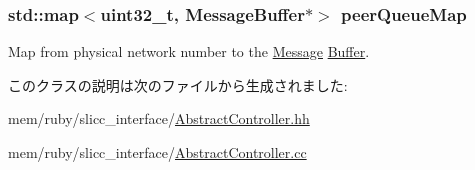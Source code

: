 \label{classAbstractController_a90f25dd5a7f1085002cab4e1e98f9232}
\hypertarget{classAbstractController_ab2e155eabfce9e3d4b821328ecb302f9}{
\subsubsection[{peerQueueMap}]{\setlength{\rightskip}{0pt plus 5cm}std::map$<${\bf uint32\_\-t}, {\bf MessageBuffer}$\ast$$>$ {\bf peerQueueMap}}}
\label{classAbstractController_ab2e155eabfce9e3d4b821328ecb302f9}


Map from physical network number to the \hyperlink{classMessage}{Message} \hyperlink{classBuffer}{Buffer}. 

このクラスの説明は次のファイルから生成されました:\begin{DoxyCompactItemize}
\item 
mem/ruby/slicc\_\-interface/\hyperlink{AbstractController_8hh}{AbstractController.hh}\item 
mem/ruby/slicc\_\-interface/\hyperlink{AbstractController_8cc}{AbstractController.cc}\end{DoxyCompactItemize}
